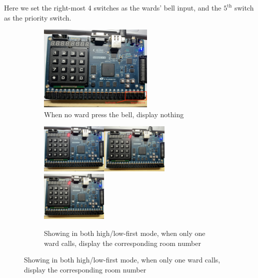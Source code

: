 \documentclass[onecolumn, oneside, ctexart]{SUSTechHomework}
\begin{document}
\vspace{-3em}
\par Here we set the right-most 4 switches as the wards' bell input, and the $5^{\text{th}}$ switch as the priority switch.
\begin{figure}[!h]
	\centering
	\begin{subfigure}[b]{0.8\textwidth}
		\centerline{\includegraphics[width=0.6\textwidth]{./t1/noinp.jpg}}
		\caption{When no ward press the bell, display nothing}
	\end{subfigure}
	\begin{subfigure}[b]{\textwidth}
		\centerline{\includegraphics[width=0.35\textwidth]{./t1/lof1.jpg}\qquad\includegraphics[width=0.35\textwidth]{./t1/lof2.jpg}
			\qquad\includegraphics[width=0.35\textwidth]{./t1/hif1.jpg}}
		\caption{Showing in both high/low-first mode, when only one ward calls, display the corresponding room number}

\end{subfigure}
\end{figure}
\end{document}
